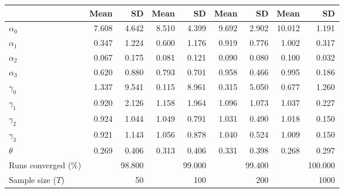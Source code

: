 
\begin{tabular}[t]{lrrrrrrrr}
\toprule
  & Mean & SD & Mean  & SD  & Mean   & SD   & Mean    & SD   \\
\midrule
$\alpha_{0}$ & 7.608 & 4.642 & 8.510 & 4.399 & 9.692 & 2.902 & 10.012 & 1.191\\
$\alpha_{1}$ & 0.347 & 1.224 & 0.600 & 1.176 & 0.919 & 0.776 & 1.002 & 0.317\\
$\alpha_{2}$ & 0.067 & 0.175 & 0.081 & 0.121 & 0.090 & 0.080 & 0.100 & 0.032\\
$\alpha_{3}$ & 0.620 & 0.880 & 0.793 & 0.701 & 0.958 & 0.466 & 0.995 & 0.186\\
$\gamma_{0}$ & 1.337 & 9.541 & 0.115 & 8.961 & 0.315 & 5.050 & 0.677 & 1.260\\
$\gamma_{1}$ & 0.920 & 2.126 & 1.158 & 1.964 & 1.096 & 1.073 & 1.037 & 0.227\\
$\gamma_{2}$ & 0.924 & 1.044 & 1.049 & 0.791 & 1.031 & 0.490 & 1.018 & 0.150\\
$\gamma_{3}$ & 0.921 & 1.143 & 1.056 & 0.878 & 1.040 & 0.524 & 1.009 & 0.150\\
$\theta$ & 0.269 & 0.406 & 0.313 & 0.406 & 0.331 & 0.398 & 0.268 & 0.297\\
Runs converged (\%) &  & 98.800 &  & 99.000 &  & 99.400 &  & 100.000\\
Sample size ($T$) &  & 50 &  & 100 &  & 200 &  & 1000\\
\bottomrule
\end{tabular}
